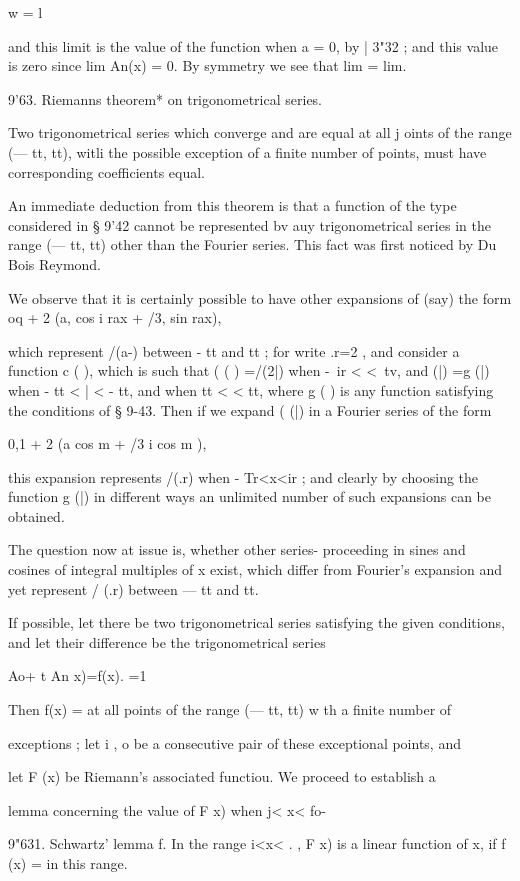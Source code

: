 {w = l

and this limit is the value of the function when a = 0, by | 3"32 ;
and this value is zero since lim An(x) = 0. By symmetry we see that
lim = lim.

9'63. Riemanns theorem* on trigonometrical series.

Two trigonometrical series which converge and are equal at all j oints
of the range (— tt, tt), witli the possible exception of a finite
number of points, must have corresponding coefficients equal.

An immediate deduction from this theorem is that a function of the
type considered in § 9'42 cannot be represented bv auy trigonometrical
series in the range (— tt, tt) other than the Fourier series. This
fact was first noticed by Du Bois Reymond.

We observe that it is certainly possible to have other expansions of
(say) the form oq + 2 (a, cos i rax + /3, sin rax),

which represent /(a-) between - tt and tt ; for write .r=2 , and
consider a function c ( ), which is such that ( ( ) =/(2|) when -\ ir
< <\ tv, and (|) =g (|) when - tt < | < - tt, and when tt < < tt,
where g ( ) is any function satisfying the conditions of § 9-43. Then
if we expand ( (|) in a Fourier series of the form

0,1 + 2 (a cos m + /3 i cos m ),

this expansion represents /(.r) when - Tr<x<ir ; and clearly by
choosing the function g (|) in different ways an unlimited number of
such expansions can be obtained.

The question now at issue is, whether other series- proceeding in
sines and cosines of integral multiples of x exist, which differ from
Fourier's expansion and yet represent / (.r) between — tt and tt.

If possible, let there be two trigonometrical series satisfying the
given conditions, and let their difference be the trigonometrical
series

Ao+ t An x)=f(x). =1

Then f(x) = at all points of the range (— tt, tt) w th a finite number
of

exceptions ; let i , o be a consecutive pair of these exceptional
points, and

let F (x) be Riemann's associated functiou. We proceed to establish a

lemma concerning the value of F x) when j< x< fo-

9"631. Schwartz' lemma f. In the range i<x< . , F x) is a linear
function of x, if f (x) = in this range.

}
